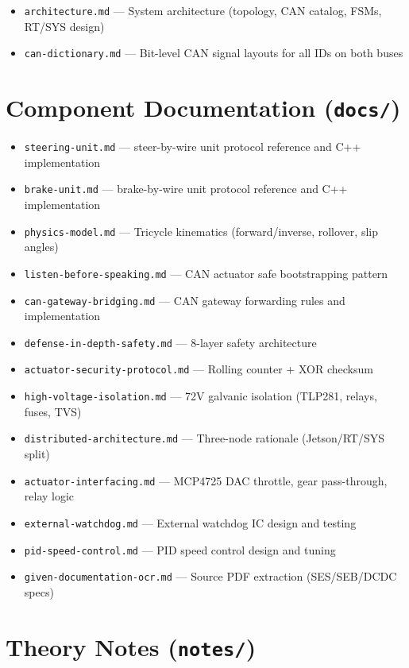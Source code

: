 \documentclass[12pt,a4paper,oneside]{report}
\begin{document}
\begin{itemize}[leftmargin=*,nosep]
  \item \texttt{architecture.md} --- System architecture (topology, CAN catalog, FSMs, RT/SYS design)
  \item \texttt{can-dictionary.md} --- Bit-level CAN signal layouts for all IDs on both buses
\end{itemize}

\section{Component Documentation (\texttt{docs/})}

\begin{itemize}[leftmargin=*,nosep]
  \item \texttt{steering-unit.md} --- steer-by-wire unit protocol reference and C++ implementation
  \item \texttt{brake-unit.md} --- brake-by-wire unit protocol reference and C++ implementation
  \item \texttt{physics-model.md} --- Tricycle kinematics (forward/inverse, rollover, slip angles)
  \item \texttt{listen-before-speaking.md} --- CAN actuator safe bootstrapping pattern
  \item \texttt{can-gateway-bridging.md} --- CAN gateway forwarding rules and implementation
  \item \texttt{defense-in-depth-safety.md} --- 8-layer safety architecture
  \item \texttt{actuator-security-protocol.md} --- Rolling counter + XOR checksum
  \item \texttt{high-voltage-isolation.md} --- 72V galvanic isolation (TLP281, relays, fuses, TVS)
  \item \texttt{distributed-architecture.md} --- Three-node rationale (Jetson/RT/SYS split)
  \item \texttt{actuator-interfacing.md} --- MCP4725 DAC throttle, gear pass-through, relay logic
  \item \texttt{external-watchdog.md} --- External watchdog IC design and testing
  \item \texttt{pid-speed-control.md} --- PID speed control design and tuning
  \item \texttt{given-documentation-ocr.md} --- Source PDF extraction (SES/SEB/DCDC specs)
\end{itemize}

\section{Theory Notes (\texttt{notes/})}
\end{document}

